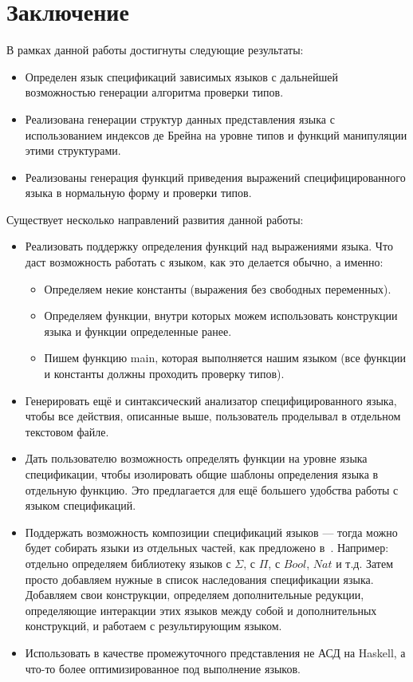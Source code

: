 \documentclass{spbau-diploma}
\begin{document}





\section*{Заключение}

В рамках данной работы достигнуты следующие результаты:
\begin{itemize}
  \item Определен язык спецификаций зависимых языков с дальнейшей возможностью генерации алгоритма проверки типов.
  \item Реализована генерации структур данных представления языка с использованием индексов де Брейна на уровне типов и функций манипуляции этими структурами.
  \item Реализованы генерация функций приведения выражений специфицированного языка в нормальную форму и проверки типов.
\end{itemize}

Существует несколько направлений развития данной работы:
\begin{itemize}
  \item Реализовать поддержку определения функций над выражениями языка. Что даст возможность работать с языком, как это делается обычно, а именно:
  \begin{itemize}
    \item Определяем некие константы (выражения без свободных переменных).
    \item Определяем функции, внутри которых можем использовать конструкции языка и функции определенные ранее.
    \item Пишем функцию main, которая выполняется нашим языком (все функции и константы должны проходить проверку типов).
  \end{itemize}
  \item Генерировать ещё и синтаксический анализатор специфицированного языка, чтобы все действия, описанные выше, пользователь проделывал в отдельном текстовом файле.
  \item Дать пользователю возможность определять функции на уровне языка спецификации, чтобы изолировать общие шаблоны определения языка в отдельную функцию. Это предлагается для ещё большего удобства работы с языком спецификаций.
  \item Поддержать возможность композиции спецификаций языков --- тогда можно будет собирать языки из отдельных частей, как предложено в~\cite{isaev}. Например: отдельно определяем библиотеку языков с $\Sigma$, с $\Pi$, с $Bool$, $Nat$ и т.д. Затем просто добавляем нужные в список наследования спецификации языка. Добавляем свои конструкции, определяем дополнительные редукции, определяющие интеракции этих языков между собой и дополнительных конструкций, и работаем с результирующим языком.
  \item Использовать в качестве промежуточного представления\cite{IR} не АСД на Haskell, а что-то более оптимизированное под выполнение языков.
\end{itemize}






\end{document}
